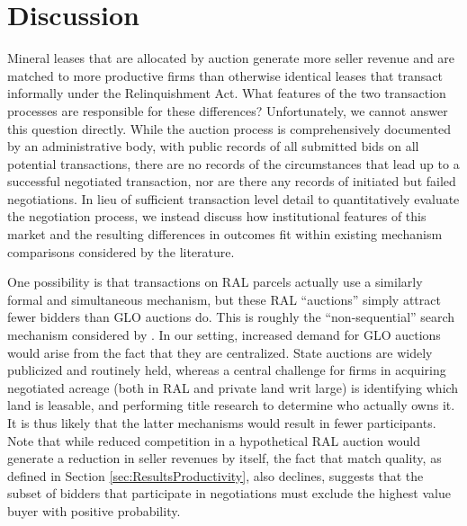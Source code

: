 \documentclass[12pt]{article}
\begin{document}
\section{Discussion \label{sec:Discussion}}
Mineral leases that are allocated by auction generate more seller revenue and are matched to more productive firms than otherwise identical leases that transact informally under the Relinquishment Act.  What features of the two transaction processes are responsible for these differences? Unfortunately, we cannot answer this question directly. While the auction process is comprehensively documented by an administrative body, with public records of all submitted bids on all potential transactions, there are no records of the circumstances that lead up to a successful negotiated transaction, nor are there any records of initiated but failed negotiations.  In lieu of sufficient transaction level detail to quantitatively evaluate the negotiation process, we instead discuss how institutional features of this market and the resulting differences in outcomes fit within existing mechanism comparisons considered by the literature.  

One possibility is that transactions on RAL parcels actually use a similarly formal and simultaneous mechanism, but these RAL ``auctions'' simply attract fewer bidders than GLO auctions do. This is roughly the ``non-sequential'' search mechanism considered by \cite{salz_intermediation_2017}. In our setting, increased demand for GLO auctions would arise from the fact that they are centralized. State auctions are widely publicized and routinely held, whereas a central challenge for firms in acquiring negotiated acreage (both in RAL and private land writ large) is identifying which land is leasable, and performing title research to determine who actually owns it. It is thus likely that the latter mechanisms would result in fewer participants.  Note that while reduced competition in a hypothetical RAL auction would generate a reduction in seller revenues by itself, the fact that match quality, as defined in Section \ref{sec:ResultsProductivity}, also declines, suggests that the subset of bidders that participate in negotiations must exclude the highest value buyer with positive probability. 
\end{document}
